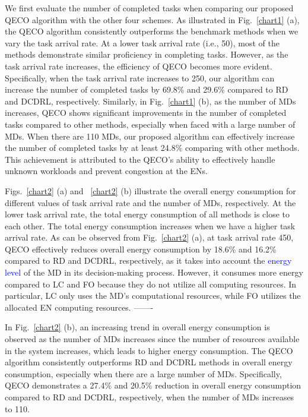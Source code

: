 \documentclass[10pt, journal,letterpaper]{IEEEtran}
\begin{document}
We first evaluate the number of completed tasks when comparing our proposed QECO algorithm with the other four schemes. As illustrated in Fig.~\ref{chart1} (a), the QECO algorithm consistently outperforms the benchmark methods when we vary the task arrival rate. At a lower task arrival rate (i.e., 50), most of the methods demonstrate similar proficiency in completing tasks. However, as the task arrival rate increases, the efficiency of QECO becomes more evident. Specifically, when the task arrival rate increases to 250, our algorithm can increase the number of completed tasks by 69.8\% and 29.6\% compared to RD and DCDRL, respectively.
Similarly, in Fig.~\ref{chart1} (b), as the number of MDs increases, QECO shows significant improvements in the number of completed tasks compared to other methods, especially when faced with a large number of MDs. When there are 110 MDs, our proposed algorithm can effectively increase the number of completed tasks by at least 24.8\% comparing with other methods. This achievement is attributed to the QECO's ability to effectively handle unknown workloads and prevent congestion at the ENs.

Figs.~\ref{chart2} (a) and ~\ref{chart2} (b) illustrate the overall energy consumption for different values of task arrival rate and the number of MDs, respectively. At the lower task arrival rate, the total energy consumption of all methods is close to each other. The total energy consumption increases when we have a higher task arrival rate.  
As can be observed from Fig.~\ref{chart2} (a), at task arrival rate 450, QECO effectively reduces overall energy consumption by 18.6\% and 16.2\% compared to RD and DCDRL, respectively, as it takes into account the \textcolor{blue}{energy level} of the MD in its decision-making process. However, it consumes more energy compared to LC and FO because they do not utilize all computing resources. In particular, LC only uses the MD's computational resources, while FO utilizes the allocated EN computing resources. -------






In Fig.~\ref{chart2} (b), an increasing trend in overall energy consumption is observed as the number of MDs increases since the number of resources available in the system increases, which leads to higher energy consumption. The QECO algorithm consistently outperforms RD and DCDRL methods in overall energy consumption, especially when there are a large number of MDs. Specifically, QECO demonstrates a 27.4\% and 20.5\% reduction in overall energy consumption compared to RD and DCDRL, respectively, when the number of MDs increases to 110.
\end{document}
